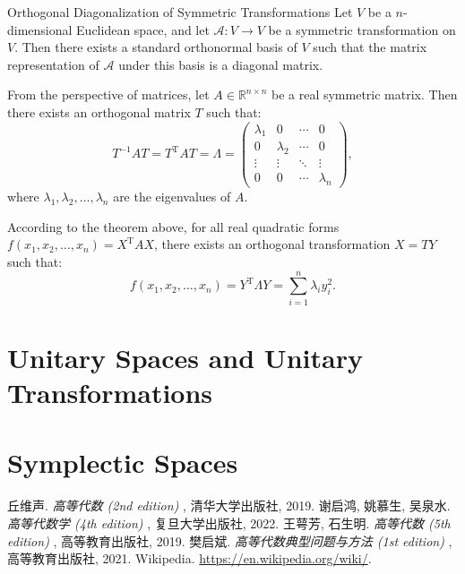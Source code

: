 \documentclass[11pt]{../../TexTemplate/elegantbook} %
\begin{document}
\begin{theorem}{Orthogonal Diagonalization of Symmetric Transformations}
    Let \( V \) be a \( n \)-dimensional Euclidean space, 
    and let \( \mathcal{A}: V \to V \) be a symmetric transformation on \( V \).
    Then there exists a standard orthonormal basis of \( V \) such that 
    the matrix representation of \( \mathcal{A} \) under this basis is a diagonal matrix.
    
    From the perspective of matrices,
    let \( A \in \mathbb{R}^{n \times n} \) be a real symmetric matrix.
    Then there exists an orthogonal matrix \( T \) such that:
    \[
    T^{-1} A T = T^{\mathrm{T}} A T = \Lambda = 
        \begin{pmatrix}
        \lambda_1 & 0 & \cdots & 0 \\
        0 & \lambda_2 & \cdots & 0 \\
        \vdots & \vdots & \ddots & \vdots \\
        0 & 0 & \cdots & \lambda_n
        \end{pmatrix},
    \]
    where \( \lambda_1, \lambda_2, \dots, \lambda_n \) are the eigenvalues of \( A \).
\end{theorem}

\begin{note}
    According to the theorem above,
    for all real quadratic forms \( f(x_1, x_2, \dots, x_n) = X^{\mathrm{T}} A X \),
    there exists an orthogonal transformation \( X = T Y \) such that:
    \[
    f(x_1, x_2, \dots, x_n) = Y^{\mathrm{T}} \Lambda Y = \sum_{i=1}^{n} \lambda_i y_i^2.
    \]
\end{note}

\section{Unitary Spaces and Unitary Transformations}

\section{Symplectic Spaces}

\begin{thebibliography}{99} 
 丘维声. \emph{ 高等代数 (2nd edition) }, 清华大学出版社, 2019. 
 谢启鸿, 姚慕生, 吴泉水. \emph{ 高等代数学 (4th edition) }, 复旦大学出版社, 2022.
 王萼芳, 石生明. \emph{ 高等代数 (5th edition) }, 高等教育出版社, 2019.
 樊启斌. \emph{ 高等代数典型问题与方法 (1st edition) }, 高等教育出版社, 2021.
 Wikipedia. \url{https://en.wikipedia.org/wiki/}.
\end{thebibliography}
\end{document}
